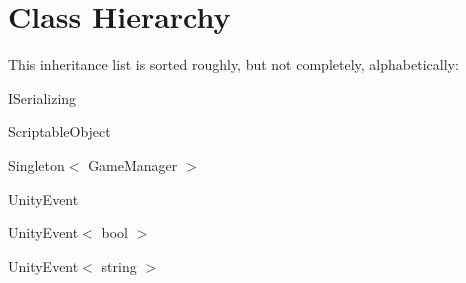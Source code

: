 \section{Class Hierarchy}
This inheritance list is sorted roughly, but not completely, alphabetically\-:\begin{DoxyCompactList}
\item I\-Serializing\begin{DoxyCompactList}
\item {}
\item {}
\end{DoxyCompactList}
\item {}
\item Scriptable\-Object\begin{DoxyCompactList}
\item {}
\end{DoxyCompactList}
\item Singleton$<$ Game\-Manager $>$\begin{DoxyCompactList}
\item {}
\end{DoxyCompactList}
\item Unity\-Event\begin{DoxyCompactList}
\item {}
\end{DoxyCompactList}
\item Unity\-Event$<$ bool $>$\begin{DoxyCompactList}
\item {}
\end{DoxyCompactList}
\item Unity\-Event$<$ string $>$\begin{DoxyCompactList}
\item {}
\end{DoxyCompactList}
\end{DoxyCompactList}
